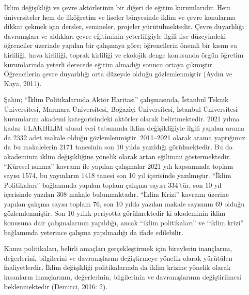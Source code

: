 \documentclass[
]{book}
\begin{document}
İklim değişikliği ve çevre aktörlerinin bir diğeri de eğitim kurumlarıdır. Hem üniversiteler hem de ilköğretim ve liseler bünyesinde iklim ve çevre konularına dikkat çekmek için dersler, semineler, projeler yürütülmektedir. Çevre duyarlılığı davranışları ve aldıkları çevre eğitiminin yeterliliğiyle ilgili lise düzeyindeki öğrenciler üzerinde yapılan bir çalışmaya göre; öğrencilerin önemli bir kısmı su kirliliği, hava kirliliği, toprak kirliliği ve ekolojik denge konusunda örgün öğretim kurumlarında yeterli derecede eğitim almadığı sonucu ortaya çıkmıştır. Öğrencilerin çevre duyarlılığı orta düzeyde olduğu gözlemlenmiştir (Aydın ve Kaya, 2011).

Şahin; ``İklim Politikalarında Aktör Haritası'' çalışmasında, İstanbul Teknik Üniversitesi, Marmara Üniversitesi, Boğaziçi Üniversitesi, İstanbul Üniversitesi kurumlarını akademi kategorisindeki aktörler olarak belirtmektedir. 2021 yılına kadar ULAKBİLİM ulusal veri tabanında iklim değişikliğiyle ilgili yapılan arama da 2332 adet makale olduğu gözlemlenmiştir. 2011--2021 olarak arama yaptığımız da bu makalelerin 2171 tanesinin son 10 yılda yazıldığı görülmektedir. Bu da akademinin iklim değişikliğine yönelik olarak artan eğilimini göstermektedir. ``Küresel ısınma'' kavramı ile yapılan çalışmalar 2021 yılı kapsamında toplam sayısı 1574, bu yayınların 1418 tanesi son 10 yıl içerisinde yazılmıştır. ``İklim Politikaları'' bağlamında yapılan toplam çalışma sayısı 334'tür, son 10 yıl içerisinde yazılan 308 makale bulunmaktadır. ``İklim Krizi'' kavramı üzerine yapılan çalışma sayısı toplam 76, son 10 yılda yazılan makale sayısının 69 olduğu gözlemlenmiştir. Son 10 yıllık periyotta görülmektedir ki akademinin iklim konusuna dair çalışmalarının yapıldığı, ancak ``iklim politikaları'' ve ``iklim krizi'' bağlamında yeterince çalışma yapılmadığı da ifade edilebilir.

Kamu politikaları, belirli amaçları gerçekleştirmek için bireylerin inançlarını, değerlerini, bilgilerini ve davranışlarını değiştirmeye yönelik olarak yürütülen faaliyetlerdir. İklim değişikliği politikalarında da iklim krizine yönelik olarak insanların inançlarının, değerlerinin, bilgilerinin ve davranışlarının değiştirilmesi beklenmektedir (Demirci, 2016: 2). \citet{basucurehberi2008}

\citet{autocontent}

  
\end{document}
